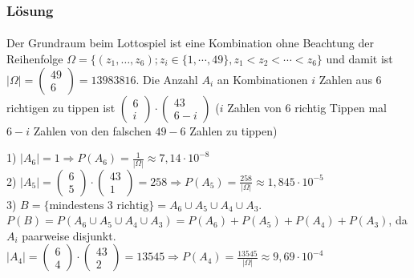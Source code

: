 \documentclass{beamer}
\begin{document}
\begin{frame}
    \frametitle{Lösung}
\framesubtitle{}
 Der Grundraum beim Lottospiel ist eine Kombination ohne Beachtung der Reihenfolge
$\Omega = \{ (z_1, \dots,  z_6);  z_i \in \{1, \cdots, 49 \} , z_1 < z_2 < \cdots < z_6 \}$ und damit ist $| \Omega| = \begin{pmatrix} 
    49 \\ 6 \end{pmatrix} = 13983816$.
Die Anzahl $A_i$ an Kombinationen $i$  Zahlen aus $6$ richtigen zu tippen ist $ \begin{pmatrix} 
    6 \\ i \end{pmatrix} \cdot \begin{pmatrix} 
    43   \\ 6 -i \end{pmatrix}$ ($i$ Zahlen von $6$ richtig Tippen mal $6-i$ Zahlen von den falschen $49-6$ Zahlen zu tippen)

1) $ | A_6 |  = 1 \Rightarrow P(A_6) = \frac{1}{|\Omega|}  \approx 7,14 \cdot 10^{-8}$
\\ 2) $ | A_5 |  =  \begin{pmatrix} 
    6 \\ 5 \end{pmatrix} \cdot \begin{pmatrix} 
    43   \\ 1 \end{pmatrix} = 258 \Rightarrow P(A_5) = \frac{258}{|\Omega|}   \approx 1,845 \cdot 10^{-5}$
\\ 3) $B = \{ \text{mindestens 3 richtig}\} = A_6 \cup A_5 \cup A_4 \cup A_3$.   $P(B) = P (A_6 \cup A_5 \cup A_4 \cup A_3)= P(A_6) + P(A_5) + P(A_4) + P(A_3)$, da $A_i$ paarweise disjunkt.
 $ | A_4 |  =  \begin{pmatrix} 
    6 \\ 4 \end{pmatrix} \cdot \begin{pmatrix} 
    43   \\ 2 \end{pmatrix} = 13545 \Rightarrow P(A_4) = \frac{13545}{|\Omega|}   \approx 9,69 \cdot 10^{-4}$

 \end{frame}
\end{document}

